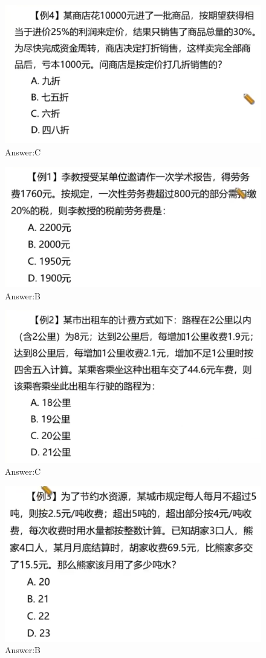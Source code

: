 \documentclass{article}
\numberwithin{equation}{section}						%
\numberwithin{figure}{section}							%
\begin{document}
\begin{sloppypar}
\begin{figure}[H]
     \centering
     \includegraphics[width=0.6\linewidth]{282.png}
		\caption{Answer:C}
\end{figure}

\begin{figure}[H]
     \centering
     \includegraphics[width=0.6\linewidth]{283.png}
		\caption{Answer:B}
\end{figure}


\begin{figure}[H]
     \centering
     \includegraphics[width=0.6\linewidth]{284.png}
		\caption{Answer:C}
\end{figure}


\begin{figure}[H]
     \centering
     \includegraphics[width=0.6\linewidth]{285.png}
		\caption{Answer:B}
\end{figure}



\end{sloppypar}
\end{document}
